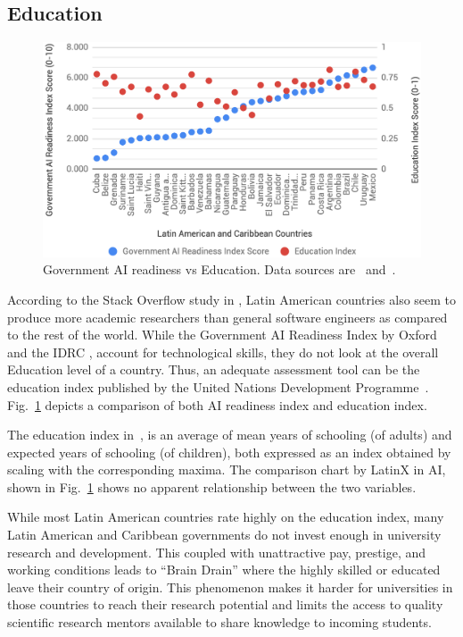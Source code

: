 \documentclass[conference]{IEEEtran}
\begin{document}
\subsection{Education}

\begin{figure}[!t]
\centering
\includegraphics[width=\columnwidth]{education}
\caption{Government AI readiness vs Education. Data sources are~\cite{miller2019government} and~\cite{undp2018education}.}
\label{fig:education}
\end{figure}

According to the Stack Overflow study in \cite{silge2018hiring}, Latin American countries also seem to produce more academic researchers than general software engineers as compared to the rest of the world. While the Government AI Readiness Index by Oxford and the IDRC \cite{miller2019government}, account for technological skills, they do not look at the overall Education level of a country. Thus, an adequate assessment tool can be the education index published by the United Nations Development Programme~\cite{undp2018education}. Fig.~\ref{fig:education} depicts a comparison of both AI readiness index and education index.

The education index in~\cite{undp2018education}, is an average of mean years of schooling (of adults) and expected years of schooling (of children), both expressed as an index obtained by scaling with the corresponding maxima. The comparison chart by LatinX in AI\texttrademark, shown in Fig.~\ref{fig:education} shows no apparent relationship between the two variables. 

While most Latin American countries rate highly on the education index, many Latin American and Caribbean governments do not invest enough in university research and development. This coupled with unattractive pay, prestige, and working conditions leads to ``Brain Drain'' where the highly skilled or educated leave their country of origin. This phenomenon makes it harder for universities in those countries to reach their research potential and limits the access to quality scientific research mentors available to share knowledge to incoming students.
\end{document}
